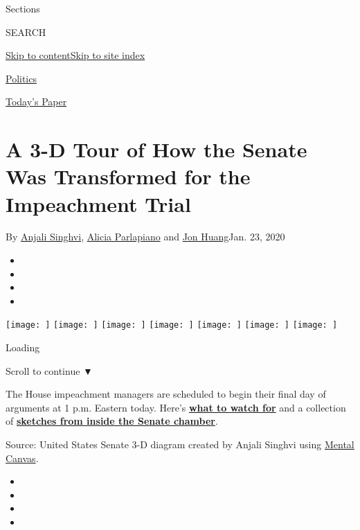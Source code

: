 Sections

SEARCH

\protect\hyperlink{site-content}{Skip to
content}\protect\hyperlink{site-index}{Skip to site index}

\href{https://www.nytimes3xbfgragh.onion/section/politics}{Politics}

\href{https://myaccount.nytimes3xbfgragh.onion/auth/login?response_type=cookie\&client_id=vi}{}

\href{https://www.nytimes3xbfgragh.onion/section/todayspaper}{Today's
Paper}

\hypertarget{a-3-d-tour-of-how-the-senate-was-transformed-for-the-impeachment-trial}{%
\section{A 3-D Tour of How the Senate Was Transformed for the
Impeachment
Trial}\label{a-3-d-tour-of-how-the-senate-was-transformed-for-the-impeachment-trial}}

By \href{https://www.nytimes3xbfgragh.onion/by/anjali-singhvi}{Anjali
Singhvi},
\href{https://www.nytimes3xbfgragh.onion/by/alicia-parlapiano}{Alicia
Parlapiano} and
\href{https://www.nytimes3xbfgragh.onion/by/jon-huang}{Jon Huang}Jan.
23, 2020

\begin{itemize}
\item
\item
\item
\item
\end{itemize}

 \texttt{[image: ]} \texttt{[image: ]} \texttt{[image: ]}
\texttt{[image: ]} \texttt{[image: ]} \texttt{[image: ]}
\texttt{[image: ]}

Loading

Scroll to continue ▼

The House impeachment managers are scheduled to begin their final day of
arguments at 1 p.m. Eastern today. Here's
\textbf{\href{https://www.nytimes3xbfgragh.onion/2020/01/24/us/politics/impeachment.html}{what
to watch for}} and a collection of
\textbf{\href{https://www.nytimes3xbfgragh.onion/interactive/2020/01/16/us/politics/senate-impeachment-trial-sketches.html}{sketches
from inside the Senate chamber}}.

Source: United States Senate \textbar{} 3-D diagram created by Anjali
Singhvi using \href{http://www.mentalcanvas.com}{Mental Canvas}.

\begin{itemize}
\item
\item
\item
\item
\end{itemize}

